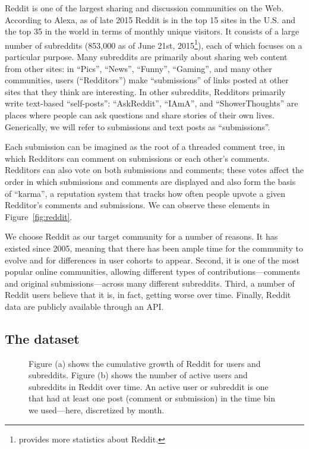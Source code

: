 Reddit is one of the largest sharing and discussion communities on the Web.  According to Alexa, as of late 2015 Reddit is in the top 15 sites in the U.S. and the top 35 in the world in terms of monthly unique visitors.  It consists of a large number of subreddits (853,000 as of June 21st, 2015\footnote{\cite{RedditStatistics} provides more statistics about Reddit.}), each of which focuses on a particular purpose.  Many subreddits are primarily about sharing web content from other sites: in ``Pics'', ``News'', ``Funny'', ``Gaming'', and many other communities, users (``Redditors'') make ``submissions'' of links posted at other sites that they think are interesting.  In other subreddits, Redditors primarily write text-based ``self-posts'': ``AskReddit'', ``IAmA'', and ``ShowerThoughts'' are places where people can ask questions and share stories of their own lives.  Generically, we will refer to submissions and text posts as ``submissions''.  

Each submission can be imagined as the root of a threaded comment tree, in which Redditors can comment on submissions or each other's comments.  Redditors can also vote on both submissions and comments; these votes affect the order in which submissions and comments are displayed and also form the basis of ``karma'', a reputation system that tracks how often people upvote a given Redditor's comments and submissions. We can observe these elements in Figure~\ref{fig:reddit}. 

We choose Reddit as our target community for a number of reasons.  It has existed since 2005, meaning that there has been ample time for the community to evolve and for differences in user cohorts to appear.  Second, it is one of the most popular online communities, allowing different types of contributions---comments and original submissions---across many different subreddits.  Third, a number of Reddit users believe that it is, in fact, getting worse over time\cite{RedditWorse1,RedditWorse2,RedditWorse3,RedditWorse4,RedditWorse5,RedditWorse6}. Finally, Reddit data are publicly available through an API.

\subsection{The dataset}

\begin{figure}[!tb]
\centering
{}
\caption{Figure (a) shows the cumulative growth of Reddit for users and subreddits. Figure (b) shows the number of active users and subreddits in Reddit over time. An active user or subreddit is one that had at least one post (comment or submission) in the time bin we used---here, discretized by month.}
\label{fig:cumulative}
\end{figure}

